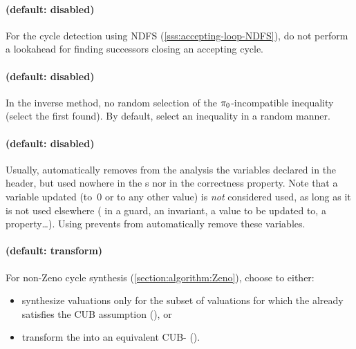 \paragraph{ (default: disabled)}
For the cycle detection using NDFS (\cref{sss:accepting-loop-NDFS}),
do not perform a lookahead for finding successors
closing an accepting cycle.


\paragraph{ (default: disabled)}
In the inverse method, no random selection of the $\pi_0$-incompatible inequality (select the first found).
By default, select an inequality in a random manner.



\paragraph{ (default: disabled)}
Usually, \imitator{} automatically removes from the analysis the variables declared in the header, but used nowhere in the \IPTA{}s nor in the correctness property.
Note that a variable updated (to~0 or to any other value) is \emph{not} considered used, as long as it is not used elsewhere (\ie{} in a guard, an invariant, a value to be updated to, a property…).
Using  prevents \imitator{} from automatically remove these variables.


\paragraph{ (default: transform)}
For non-Zeno cycle synthesis (\cref{section:algorithm:Zeno}), choose to either:
\begin{itemize}
	\item synthesize valuations only for the subset of valuations for which the \NIPTA{} already satisfies the CUB assumption (), or
	\item transform the \NIPTA{} into an equivalent CUB-\NIPTA{} ().
\end{itemize}



